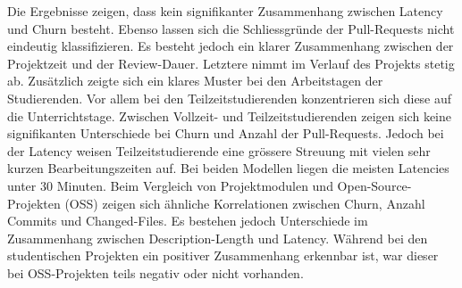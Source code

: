 \begin{extraAbstract}
 Die Ergebnisse zeigen, dass kein signifikanter Zusammenhang zwischen Latency und Churn besteht. Ebenso lassen sich die Schliessgründe der Pull-Requests nicht eindeutig klassifizieren. Es besteht jedoch ein klarer Zusammenhang zwischen der Projektzeit und der Review-Dauer. Letztere nimmt im Verlauf des Projekts stetig ab. Zusätzlich zeigte sich ein klares Muster bei den Arbeitstagen der Studierenden. Vor allem bei den Teilzeitstudierenden konzentrieren sich diese auf die Unterrichtstage. Zwischen Vollzeit- und Teilzeitstudierenden zeigen sich keine signifikanten Unterschiede bei Churn und Anzahl der Pull-Requests. Jedoch bei der Latency weisen Teilzeitstudierende eine grössere Streuung mit vielen sehr kurzen Bearbeitungszeiten auf. Bei beiden Modellen liegen die meisten Latencies unter 30 Minuten.
 Beim Vergleich von Projektmodulen und Open-Source-Projekten (OSS) zeigen sich ähnliche Korrelationen zwischen Churn, Anzahl Commits und Changed-Files. Es bestehen jedoch Unterschiede im Zusammenhang zwischen Description-Length und Latency. Während bei den studentischen Projekten ein positiver Zusammenhang erkennbar ist, war dieser bei OSS-Projekten teils negativ oder nicht vorhanden.
 

\end{extraAbstract}
